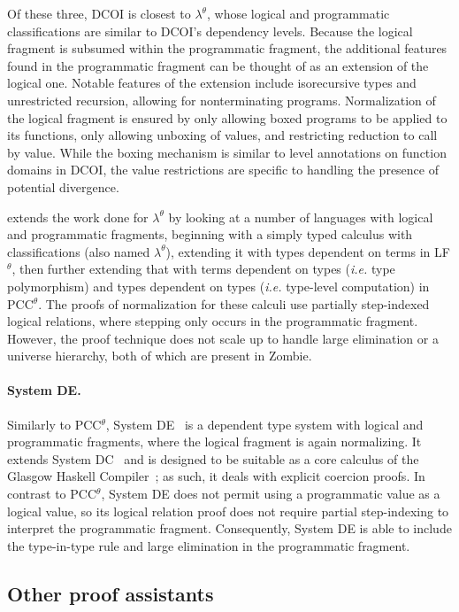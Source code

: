 \documentclass{article}
\makeatletter
\newcommand{\ie}{\textit{i.e.}\@\xspace}
\makeatother
\begin{document}
Of these three, DCOI is closest to $\lambda^\theta$,
whose logical and programmatic classifications are similar to DCOI's dependency levels.
Because the logical fragment is subsumed within the programmatic fragment,
the additional features found in the programmatic fragment can be thought of
as an extension of the logical one.
Notable features of the extension include isorecursive types and unrestricted recursion,
allowing for nonterminating programs.
Normalization of the logical fragment is ensured by
only allowing boxed programs to be applied to its functions,
only allowing unboxing of values,
and restricting reduction to call by value.
While the boxing mechanism is similar to level annotations on function domains in DCOI,
the value restrictions are specific to handling the presence of potential divergence.

 extends the work done for $\lambda^\theta$
by looking at a number of languages with logical and programmatic fragments,
beginning with a simply typed calculus with classifications (also named $\lambda^\theta$),
extending it with types dependent on terms in LF$^\theta$,
then further extending that with terms dependent on types (\ie type polymorphism)
and types dependent on types (\ie type-level computation) in PCC$^\theta$.
The proofs of normalization for these calculi use partially step-indexed logical relations,
where stepping only occurs in the programmatic fragment.
However, the proof technique does not scale up to handle large elimination or a universe hierarchy,
both of which are present in Zombie.

\paragraph{System DE.}
Similarly to PCC$^\theta$, System DE~\citep{system-de}
is a dependent type system with logical and programmatic fragments,
where the logical fragment is again normalizing.
It extends System DC~\citep{system-dc}
and is designed to be suitable as a core calculus
of the Glasgow Haskell Compiler~\citep{ghc};
as such, it deals with explicit coercion proofs.
In contrast to PCC$^\theta$,
System DE does not permit using a programmatic value as a logical value,
so its logical relation proof does not require partial step-indexing
to interpret the programmatic fragment.
Consequently, System DE is able to include
the type-in-type rule and large elimination in the programmatic fragment.

\subsection{Other proof assistants}
\end{document}
